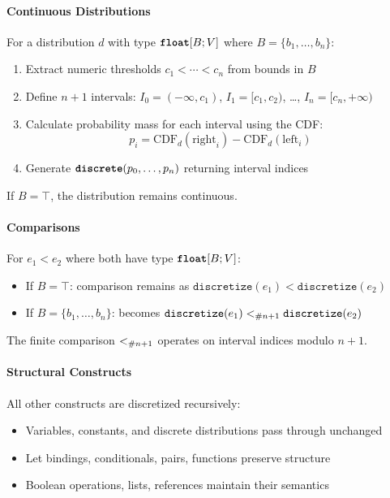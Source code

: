 \paragraph{Continuous Distributions} For a distribution $d$ with type $\text{\ttfamily\bfseries float}[B; V]$ where $B = \{b_1, \ldots, b_n\}$:
\begin{enumerate}
    \item Extract numeric thresholds $c_1 < \cdots < c_n$ from bounds in $B$
    \item Define $n+1$ intervals: $I_0 = (-\infty, c_1)$, $I_1 = [c_1, c_2)$, \ldots, $I_n = [c_n, +\infty)$
    \item Calculate probability mass for each interval using the CDF:
    \[ p_i = \text{CDF}_d(\text{right}_i) - \text{CDF}_d(\text{left}_i) \]
    \item Generate $\text{\ttfamily\bfseries discrete}(p_0, \ldots, p_n)$ returning interval indices
\end{enumerate}

If $B = \top$, the distribution remains continuous.

\paragraph{Comparisons} For $e_1 < e_2$ where both have type $\text{\ttfamily\bfseries float}[B; V]$:
\begin{itemize}
    \item If $B = \top$: comparison remains as $\texttt{discretize}(e_1) < \texttt{discretize}(e_2)$
    \item If $B = \{b_1, \ldots, b_n\}$: becomes $\texttt{discretize}(e_1) <_{\#{n+1}} \texttt{discretize}(e_2)$
\end{itemize}

The finite comparison $<_{\#{n+1}}$ operates on interval indices modulo $n+1$.

\paragraph{Structural Constructs} All other constructs are discretized recursively:
\begin{itemize}
    \item Variables, constants, and discrete distributions pass through unchanged
    \item Let bindings, conditionals, pairs, functions preserve structure
    \item Boolean operations, lists, references maintain their semantics
\end{itemize}

